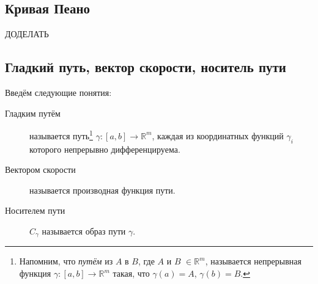 \subsection{Кривая Пеано}

\begin{example}
	ДОДЕЛАТЬ
\end{example}

\subsection{Гладкий путь, вектор скорости, носитель пути}

\begin{definition}
	Введём следующие понятия:
	\begin{description}
		\item[Гладким путём] называется путь\footnote{Напомним, что \textit{путём} из \(A\) в \(B\), где \(A\) и \(B\) \(\in \mathbb{R}^m\), называется непрерывная функция \(\gamma \colon [a, b] \to \mathbb{R}^m\) такая, что \(\gamma(a) = A\), \(\gamma(b) = B\).} \(\gamma \colon [a, b] \to \mathbb{R}^m\), каждая из координатных функций \(\gamma_i\) которого непрерывно дифференцируема.
		\item[Вектором скорости] называется производная функция пути.
		\item[Носителем пути] \(C_\gamma\) называется образ пути \(\gamma\).
	\end{description}
\end{definition}